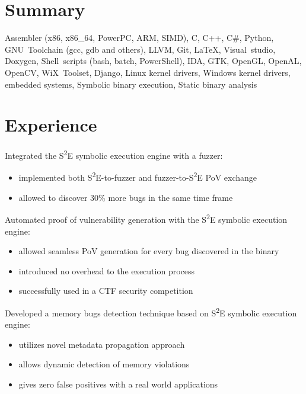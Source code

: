 \documentclass[11pt, a4paper]{moderncv}
\begin{document}
\makecvtitle



\section{Summary}


{
  Assembler (x86, x86\_64, PowerPC, ARM, SIMD), C, C++, C\#, Python,
  GNU~Toolchain (gcc, gdb and others), LLVM, Git, LaTeX, Visual~studio, Doxygen, Shell~scripts (bash, batch, PowerShell), IDA,
  GTK, OpenGL, OpenAL, OpenCV, WiX~Toolset, Django,
  Linux kernel drivers, Windows kernel drivers, embedded systems,
  Symbolic binary execution, Static binary analysis
}




\section{Experience}

{
  Integrated the S\textsuperscript{2}E symbolic execution engine with a fuzzer:
    \begin{itemize}
      \item implemented both S\textsuperscript{2}E-to-fuzzer and fuzzer-to-S\textsuperscript{2}E PoV exchange
      \item allowed to discover 30\% more bugs in the same time frame
    \end{itemize}
  Automated proof of vulnerability generation with the S\textsuperscript{2}E symbolic execution engine:
    \begin{itemize}
      \item allowed seamless PoV generation for every bug discovered in the binary
      \item introduced no overhead to the execution process
      \item successfully used in a CTF security competition
    \end{itemize}
  Developed a memory bugs detection technique based on S\textsuperscript{2}E symbolic execution engine:
    \begin{itemize}
      \item utilizes novel metadata propagation approach
      \item allows dynamic detection of memory violations
      \item gives zero false positives with a real world applications
    \end{itemize}
}
\end{document}
